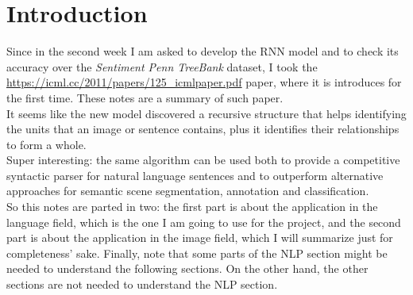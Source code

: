 \section{Introduction}

Since in the second week I am asked to develop the RNN model and to check its
accuracy over the \textit{Sentiment Penn TreeBank} dataset, I took the
\url{https://icml.cc/2011/papers/125_icmlpaper.pdf} paper, where it is
introduces for the first time. These notes are a summary of such paper.\\
It seems like the new model discovered a recursive structure that helps
identifying the units that an image or sentence contains, plus it identifies
their relationships to form a whole.\\
Super interesting: the same algorithm can be used both to provide a competitive
syntactic parser for natural language sentences and to outperform alternative
approaches for semantic scene segmentation, annotation and classification.\\
So this notes are parted in two: the first part is about the application in the
language field, which is the one I am going to use for the project, and the
second part is about the application in the image field, which I will summarize
just for completeness' sake. Finally, note that some parts of the NLP section
might be needed to understand the following sections. On the other hand, the
other sections are not needed to understand the NLP section.
